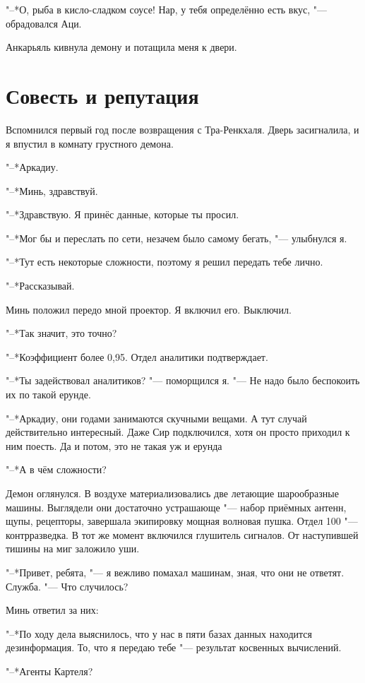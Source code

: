 \documentclass[a4paper,10pt]{book}
\newcommand{\ldotst}{\so{...}\xspace}
\begin{document}
"--*О, рыба в кисло-сладком соусе! Нар, у тебя определённо есть вкус, "--- 
обрадовался Аци.

Анкарьяль кивнула демону и потащила меня к двери.

\section{Совесть и репутация}

Вспомнился первый год после возвращения с Тра-Ренкхаля. Дверь засигналила, и я 
впустил в комнату грустного демона.

"--*Аркадиу.

"--*Минь, здравствуй.

"--*Здравствую. Я принёс данные, которые ты просил.

"--*Мог бы и переслать по сети, незачем было самому бегать, "--- улыбнулся я.

"--*Тут есть некоторые\ldotst сложности, поэтому я решил передать тебе лично.

"--*Рассказывай.

Минь положил передо мной проектор. Я включил его. Выключил.

"--*Так значит, это точно?

"--*Коэффициент более 0,95. Отдел аналитики подтверждает.

"--*Ты задействовал аналитиков? "--- поморщился я. "--- Не надо было беспокоить 
их по такой ерунде.

"--*Аркадиу, они годами занимаются скучными вещами. А тут случай действительно 
интересный. Даже Сир подключился, хотя он просто приходил к ним поесть. Да и 
потом, это не такая уж и ерунда\ldotst

"--*А в чём сложности?

Демон оглянулся. В воздухе материализовались две летающие шарообразные машины. 
Выглядели они достаточно устрашающе "--- набор приёмных антенн, щупы, 
рецепторы, 
завершала экипировку мощная волновая пушка. Отдел 100 "--- контрразведка. В тот 
же момент включился глушитель сигналов. От наступившей тишины на миг заложило 
уши.

"--*Привет, ребята, "--- я вежливо помахал машинам, зная, что они не ответят. 
Служба. "--- Что случилось?

Минь ответил за них:

"--*По ходу дела выяснилось, что у нас в пяти базах данных находится 
дезинформация. То, что я передаю тебе "--- результат косвенных вычислений.

"--*Агенты Картеля?
\end{document}
